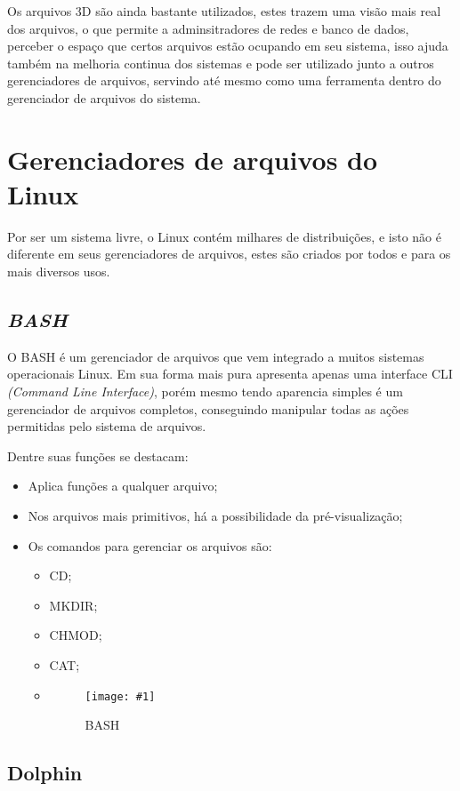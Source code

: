 \documentclass[
	12pt,				%
	openright,			%
	twoside,			%
	a4paper,			%
	chapter=TITLE,		%
	section=TITLE,		%
	english,	
	brazil				%
]{abntex2}
\newcommand{\imagem}[3]{
	\begin{figure}[htb]
		\begin{center}
			\texttt{[image: \#1]}
		\end{center}
		\caption{#2}%
	\end{figure}	
}
\begin{document}
Os arquivos 3D são ainda bastante utilizados, estes trazem uma visão mais real dos arquivos, o que permite a adminsitradores de redes e banco de dados, perceber o espaço que certos arquivos estão ocupando em seu sistema, isso ajuda também na melhoria continua dos sistemas e pode ser utilizado junto a outros  gerenciadores de arquivos, servindo até mesmo como uma ferramenta dentro do gerenciador de arquivos do sistema.

\chapter{Gerenciadores de arquivos do Linux}

Por ser um sistema livre, o Linux contém milhares de distribuições, e isto não é diferente em seus gerenciadores de arquivos, estes são criados por todos e para os mais diversos usos.

\section{\textit{BASH}}

O BASH é um gerenciador de arquivos que vem integrado a muitos sistemas operacionais Linux. Em sua forma mais pura apresenta apenas uma interface CLI \textit{(Command Line Interface)}, porém mesmo tendo aparencia simples é um gerenciador de arquivos completos, conseguindo manipular todas as ações permitidas pelo sistema de arquivos. 

Dentre suas funções se destacam:

\begin{itemize}
	\item Aplica funções a qualquer arquivo;
	\item Nos arquivos mais primitivos, há a possibilidade da pré-visualização;
	\item Os comandos para gerenciar os arquivos são:
	\begin{itemize}
		\item CD;
		\item MKDIR;
		\item CHMOD;
		\item CAT;
	\item \imagem{bashDebian.png}{BASH}{rótulo_para_referência}
	\end{itemize}

\end{itemize}

\section{Dolphin}
\end{document}
